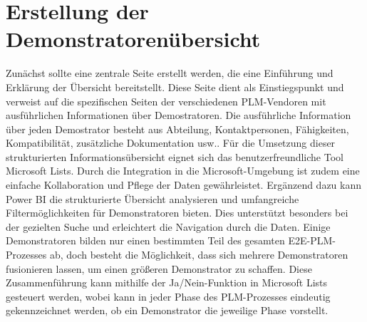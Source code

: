 \section{Erstellung der Demonstratorenübersicht}
Zunächst sollte eine zentrale Seite erstellt werden, die eine Einführung und Erklärung der Übersicht bereitstellt. Diese Seite dient als Einstiegspunkt und verweist auf die spezifischen Seiten der verschiedenen PLM-Vendoren mit ausführlichen Informationen über Demostratoren. Die ausführliche Information über jeden Demostrator besteht aus Abteilung, Kontaktpersonen, Fähigkeiten, Kompatibilität, zusätzliche Dokumentation usw.. Für die Umsetzung dieser strukturierten Informationsübersicht eignet sich das benutzerfreundliche Tool Microsoft Lists.\cite{List} Durch die Integration in die Microsoft-Umgebung ist zudem eine einfache Kollaboration und Pflege der Daten gewährleistet.\newline
Ergänzend dazu kann Power BI \cite{Power_bi} die strukturierte Übersicht analysieren und umfangreiche Filtermöglichkeiten für Demonstratoren bieten. Dies unterstützt besonders bei der gezielten Suche und erleichtert die Navigation durch die Daten.
Einige Demonstratoren bilden nur einen bestimmten Teil des gesamten E2E-PLM-Prozesses ab, doch besteht die Möglichkeit, dass sich mehrere Demonstratoren fusionieren lassen, um einen größeren Demonstrator zu schaffen. Diese Zusammenführung kann mithilfe der Ja/Nein-Funktion in Microsoft Lists gesteuert werden, wobei kann in jeder Phase des PLM-Prozesses eindeutig gekennzeichnet werden, ob ein Demonstrator die jeweilige Phase vorstellt.
